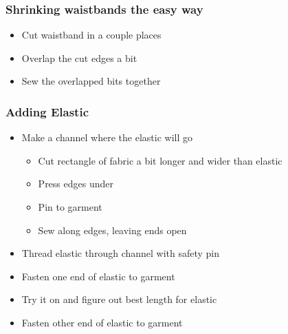 \documentclass{beamer}
\begin{document}
\begin{frame}[fragile]
\frametitle{Shrinking waistbands the easy way}
\begin{itemize}
\item Cut waistband in a couple places
\item Overlap the cut edges a bit
\item Sew the overlapped bits together
\end{itemize}
\end{frame}

\begin{frame}[fragile]
\frametitle{Adding Elastic}
\begin{itemize}
\item Make a channel where the elastic will go
    \begin{itemize}
    \item Cut rectangle of fabric a bit longer and wider than elastic
    \item Press edges under
    \item Pin to garment
    \item Sew along edges, leaving ends open
    \end{itemize}
\item Thread elastic through channel with safety pin
\item Fasten one end of elastic to garment
\item Try it on and figure out best length for elastic
\item Fasten other end of elastic to garment
\end{itemize}
\end{frame}

\begin{frame}[fragile]
\titlepage
\end{frame}
\end{document}
